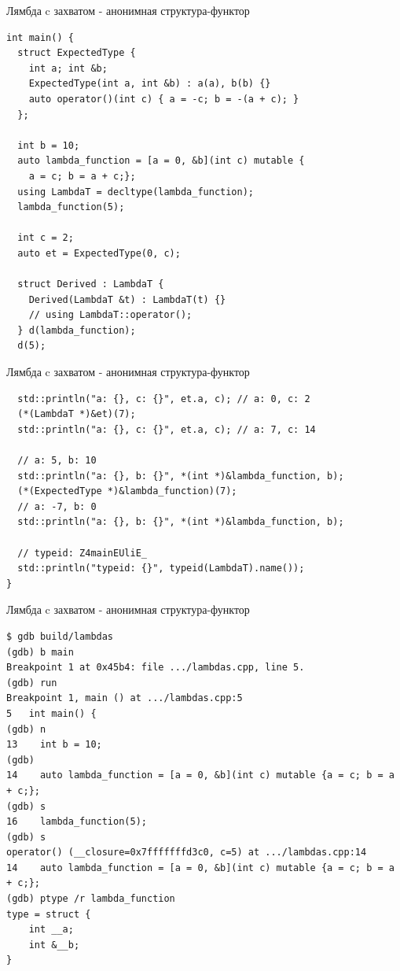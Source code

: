 \documentclass{beamer}
\begin{document}
\begin{frame}[fragile]{Лямбда c захватом - анонимная структура-функтор}
\begin{lstlisting}
int main() {
  struct ExpectedType {
    int a; int &b;
    ExpectedType(int a, int &b) : a(a), b(b) {}
    auto operator()(int c) { a = -c; b = -(a + c); }
  };

  int b = 10;
  auto lambda_function = [a = 0, &b](int c) mutable {
    a = c; b = a + c;};
  using LambdaT = decltype(lambda_function);
  lambda_function(5);

  int c = 2;
  auto et = ExpectedType(0, c);

  struct Derived : LambdaT {
    Derived(LambdaT &t) : LambdaT(t) {}
    // using LambdaT::operator();
  } d(lambda_function);
  d(5);

\end{lstlisting}
\end{frame}

\begin{frame}[fragile]{Лямбда c захватом - анонимная структура-функтор}
\begin{lstlisting}
  std::println("a: {}, c: {}", et.a, c); // a: 0, c: 2
  (*(LambdaT *)&et)(7);
  std::println("a: {}, c: {}", et.a, c); // a: 7, c: 14

  // a: 5, b: 10
  std::println("a: {}, b: {}", *(int *)&lambda_function, b);
  (*(ExpectedType *)&lambda_function)(7);
  // a: -7, b: 0
  std::println("a: {}, b: {}", *(int *)&lambda_function, b);

  // typeid: Z4mainEUliE_
  std::println("typeid: {}", typeid(LambdaT).name());
}
\end{lstlisting}
\end{frame}

\begin{frame}[fragile]{Лямбда c захватом - анонимная структура-функтор}
\begin{lstlisting}
$ gdb build/lambdas
(gdb) b main
Breakpoint 1 at 0x45b4: file .../lambdas.cpp, line 5.
(gdb) run
Breakpoint 1, main () at .../lambdas.cpp:5
5	int main() {
(gdb) n
13	  int b = 10;
(gdb)
14	  auto lambda_function = [a = 0, &b](int c) mutable {a = c; b = a + c;};
(gdb) s
16	  lambda_function(5);
(gdb) s
operator() (__closure=0x7fffffffd3c0, c=5) at .../lambdas.cpp:14
14	  auto lambda_function = [a = 0, &b](int c) mutable {a = c; b = a + c;};
(gdb) ptype /r lambda_function
type = struct {
    int __a;
    int &__b;
}
\end{lstlisting}
\end{frame}
\end{document}
